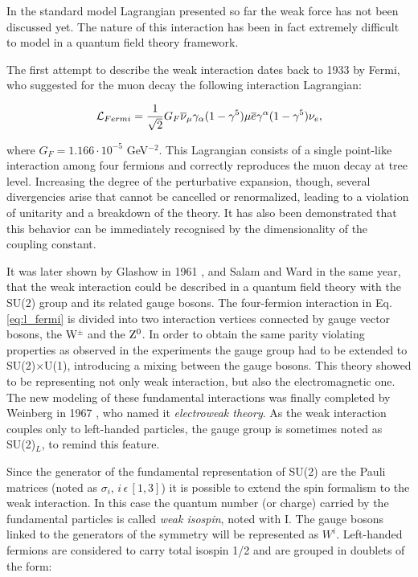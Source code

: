 In the standard model Lagrangian presented so far the weak force has not been discussed yet. The nature of this interaction has been in fact extremely difficult to model in a quantum field theory framework.

The first attempt to describe the weak interaction dates back to 1933 by Fermi, who suggested for the muon decay the following interaction Lagrangian:

\begin{equation}
\mathcal{L}_{Fermi} = \dfrac{1}{\sqrt{2}} G_F \overline{\nu}_\mu \gamma_\alpha (1-\gamma^5) \mu \overline{e} \gamma^\alpha (1-\gamma^5) \nu_e,
\label{eq:l_fermi}
\end{equation}

where $G_F = 1.166 \cdot 10^{-5}$ GeV$^{-2}$. This Lagrangian consists of a single point-like interaction among four fermions and correctly reproduces the muon decay at tree level. Increasing the degree of the perturbative expansion, though, several divergencies arise that cannot be cancelled or renormalized, leading to a violation of unitarity and a breakdown of the theory. It has also been demonstrated that this behavior can be immediately recognised by the dimensionality of the coupling constant.

It was later shown by Glashow in 1961 \cite{Glashow:1961tr}, and Salam and Ward \cite{Salam:1961en} in the same year, that the weak interaction could be described in a quantum field theory with the SU(2) group and its related gauge bosons. 
The four-fermion interaction in Eq. \ref{eq:l_fermi} is divided into two interaction vertices connected by gauge vector bosons, the W$^\pm$ and the $\mathrm{Z}^0$. In order to obtain the same parity violating properties as observed in the experiments the gauge group had to be extended to SU(2)$\times$U(1), introducing a mixing between the gauge bosons. This theory showed to be representing not only weak interaction, but also the electromagnetic one. 
The new modeling of these fundamental interactions was finally completed by Weinberg in 1967 \cite{Weinberg:1967tq}, who named it \emph{electroweak theory}. 
As the weak interaction couples only to left-handed particles, the gauge group is sometimes noted as SU(2)$_L$, to remind this feature.

Since the generator of the fundamental representation of SU(2) are the Pauli matrices (noted as $\sigma_i$, $i \, \epsilon \, [1,3]$) it is possible to extend the spin formalism to the weak interaction. In this case the quantum number (or charge) carried by the fundamental particles is called \emph{weak isospin}, noted with I. The gauge bosons linked to the generators of the symmetry will be represented as $W^i$. Left-handed fermions are considered to carry total isospin 1/2 and are grouped in doublets of the form:

